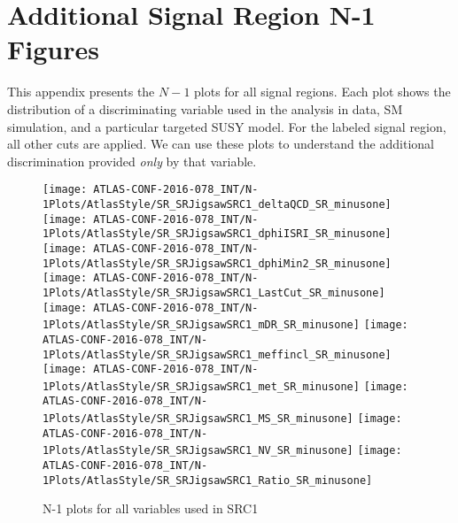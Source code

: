 

\chapter{Additional Signal Region N-1 Figures}
\label{app:n-1_plots}

This appendix presents the $N-1$ plots for all signal regions.
Each plot shows the distribution of a discriminating variable used in the analysis in data, SM simulation, and a particular targeted SUSY model.
For the labeled signal region, all other cuts are applied.
We can use these plots to understand the additional discrimination provided \textit{only} by that variable.

\begin{figure}[tbp]
\begin{center}
\texttt{[image: ATLAS-CONF-2016-078\_INT/N-1Plots/AtlasStyle/SR\_SRJigsawSRC1\_deltaQCD\_SR\_minusone]}
\texttt{[image: ATLAS-CONF-2016-078\_INT/N-1Plots/AtlasStyle/SR\_SRJigsawSRC1\_dphiISRI\_SR\_minusone]}
\texttt{[image: ATLAS-CONF-2016-078\_INT/N-1Plots/AtlasStyle/SR\_SRJigsawSRC1\_dphiMin2\_SR\_minusone]}
\texttt{[image: ATLAS-CONF-2016-078\_INT/N-1Plots/AtlasStyle/SR\_SRJigsawSRC1\_LastCut\_SR\_minusone]}
\texttt{[image: ATLAS-CONF-2016-078\_INT/N-1Plots/AtlasStyle/SR\_SRJigsawSRC1\_mDR\_SR\_minusone]}
\texttt{[image: ATLAS-CONF-2016-078\_INT/N-1Plots/AtlasStyle/SR\_SRJigsawSRC1\_meffincl\_SR\_minusone]}
\texttt{[image: ATLAS-CONF-2016-078\_INT/N-1Plots/AtlasStyle/SR\_SRJigsawSRC1\_met\_SR\_minusone]}
\texttt{[image: ATLAS-CONF-2016-078\_INT/N-1Plots/AtlasStyle/SR\_SRJigsawSRC1\_MS\_SR\_minusone]}
\texttt{[image: ATLAS-CONF-2016-078\_INT/N-1Plots/AtlasStyle/SR\_SRJigsawSRC1\_NV\_SR\_minusone]}
\texttt{[image: ATLAS-CONF-2016-078\_INT/N-1Plots/AtlasStyle/SR\_SRJigsawSRC1\_Ratio\_SR\_minusone]}
\end{center}
\caption{N-1 plots for all variables used in SRC1}
\label{fig:SR_SRJigsawSRC1_deltaQCD_SR_minusone}
\end{figure}

